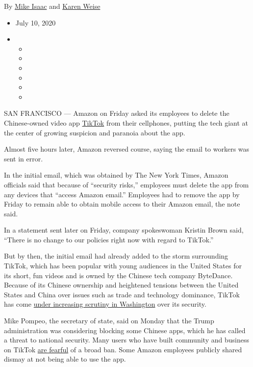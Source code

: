 By \href{https://www.nytimes3xbfgragh.onion/by/mike-isaac}{Mike Isaac}
and \href{https://www.nytimes3xbfgragh.onion/by/karen-weise}{Karen
Weise}

\begin{itemize}
\item
  July 10, 2020
\item
  \begin{itemize}
  \item
  \item
  \item
  \item
  \item
  \item
  \end{itemize}
\end{itemize}

SAN FRANCISCO --- Amazon on Friday asked its employees to delete the
Chinese-owned video app
\href{https://www.nytimes3xbfgragh.onion/2020/08/03/technology/trump-tiktok-microsoft.html}{TikTok}
from their cellphones, putting the tech giant at the center of growing
suspicion and paranoia about the app.

Almost five hours later, Amazon reversed course, saying the email to
workers was sent in error.

In the initial email, which was obtained by The New York Times, Amazon
officials said that because of ``security risks,'' employees must delete
the app from any devices that ``access Amazon email.'' Employees had to
remove the app by Friday to remain able to obtain mobile access to their
Amazon email, the note said.

In a statement sent later on Friday, company spokeswoman Kristin Brown
said, ``There is no change to our policies right now with regard to
TikTok.''

But by then, the initial email had already added to the storm
surrounding TikTok, which has been popular with young audiences in the
United States for its short, fun videos and is owned by the Chinese tech
company ByteDance. Because of its Chinese ownership and heightened
tensions between the United States and China over issues such as trade
and technology dominance, TikTok has come
\href{https://www.nytimes3xbfgragh.onion/2019/11/01/technology/tiktok-national-security-review.html}{under
increasing scrutiny in Washington} over its security.

Mike Pompeo, the secretary of state, said on Monday that the Trump
administration was considering blocking some Chinese apps, which he has
called a threat to national security. Many users who have built
community and business on TikTok
\href{https://www.nytimes3xbfgragh.onion/2020/07/10/style/tiktok-ban-us-users-influencers.html}{are
fearful} of a broad ban. Some Amazon employees publicly shared dismay at
not being able to use the app.

